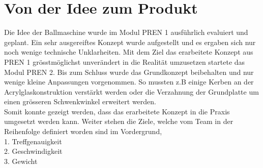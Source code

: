 \section{Von der Idee zum Produkt}

Die Idee der Ballmaschine wurde im Modul PREN 1 ausführlich evaluiert und geplant. Ein sehr ausgereiftes Konzept wurde aufgestellt und es ergaben sich nur noch wenige technische Unklarheiten. Mit dem Ziel das erarbeitete Konzept aus PREN 1 grösstmöglichst unverändert in die Realität umzusetzen startete das Modul PREN 2. Bis zum Schluss wurde das Grundkonzept beibehalten und nur wenige kleine Anpassungen vorgenommen. So mussten z.B einige Kerben an der Acrylglaskonstruktion verstärkt werden oder die Verzahnung der Grundplatte um einen grösseren Schwenkwinkel erweitert werden. \\
Somit konnte gezeigt werden, dass das erarbeitete Konzept in die Praxis umgesetzt werden kann. Weiter stehen die Ziele, welche vom Team in der Reihenfolge definiert worden sind im Vordergrund, \\

1. Treffgenauigkeit \\
2. Geschwindigkeit \\
3. Gewicht \\
